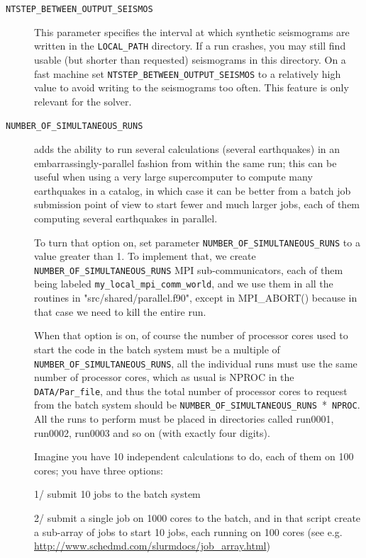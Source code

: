 \vspace{1cm}
\begin{description}
\item [{\texttt{NTSTEP\_BETWEEN\_OUTPUT\_SEISMOS}}] This parameter specifies
the interval at which synthetic seismograms are written in the \texttt{LOCAL\_PATH}
directory. If a run crashes, you may still find usable (but shorter
than requested) seismograms in this directory. On a fast machine set
\texttt{NTSTEP\_BETWEEN\_OUTPUT\_SEISMOS} to a relatively high value
to avoid writing to the seismograms too often. This feature is only
relevant for the solver.
%
\item [{\texttt{NUMBER\_OF\_SIMULTANEOUS\_RUNS}}] adds the ability to run several calculations (several earthquakes)
in an embarrassingly-parallel fashion from within the same run;
this can be useful when using a very large supercomputer to compute
many earthquakes in a catalog, in which case it can be better from
a batch job submission point of view to start fewer and much larger jobs,
each of them computing several earthquakes in parallel.

To turn that option on, set parameter \texttt{NUMBER\_OF\_SIMULTANEOUS\_RUNS} to a value greater than 1.
To implement that, we create \texttt{NUMBER\_OF\_SIMULTANEOUS\_RUNS} MPI sub-communicators,
each of them being labeled \texttt{my\_local\_mpi\_comm\_world}, and we use them
in all the routines in "src/shared/parallel.f90", except in MPI\_ABORT() because in that case
we need to kill the entire run.

When that option is on, of course the number of processor cores used to start
the code in the batch system must be a multiple of \texttt{NUMBER\_OF\_SIMULTANEOUS\_RUNS},
all the individual runs must use the same number of processor cores,
which as usual is NPROC in the \texttt{DATA/Par\_file},
and thus the total number of processor cores to request from the batch system
should be \texttt{NUMBER\_OF\_SIMULTANEOUS\_RUNS}~*~\texttt{NPROC}.
All the runs to perform must be placed in directories called run0001, run0002, run0003 and so on
(with exactly four digits).\newline

Imagine you have 10 independent calculations to do, each of them on 100 cores; you have three options:\newline

1/ submit 10 jobs to the batch system\newline

2/ submit a single job on 1000 cores to the batch, and in that script create a sub-array of jobs to start 10 jobs,
each running on 100 cores (see e.g. \url{http://www.schedmd.com/slurmdocs/job_array.html})\newline


\end{description}
